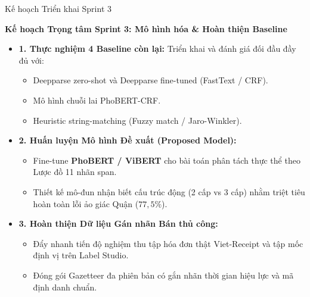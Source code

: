 \documentclass[aspectratio=169,9pt]{beamer}
\begin{document}
\begin{frame}{Kế hoạch Triển khai Sprint 3}
  \vspace{0.05cm}
  \centerline{\large\textbf{Kế hoạch Trọng tâm Sprint 3: Mô hình hóa \& Hoàn thiện Baseline}}
  \vspace{0.25cm}

  \begin{itemize}
    \setlength{\itemsep}{6pt}
    \item \textbf{1. Thực nghiệm 4 Baseline còn lại:} Triển khai và đánh giá đối đầu đầy đủ với:
      \begin{itemize}
        \setlength{\itemsep}{2pt}
        \item Deepparse zero-shot và Deepparse fine-tuned (FastText / CRF).
        \item Mô hình chuỗi lai PhoBERT-CRF.
        \item Heuristic string-matching (Fuzzy match / Jaro-Winkler).
      \end{itemize}
    \item \textbf{2. Huấn luyện Mô hình Đề xuất (Proposed Model):}
      \begin{itemize}
        \setlength{\itemsep}{2pt}
        \item Fine-tune \textbf{PhoBERT / ViBERT} cho bài toán phân tách thực thể theo Lược đồ 11 nhãn span.
        \item Thiết kế mô-đun nhận biết cấu trúc động (2 cấp vs 3 cấp) nhằm triệt tiêu hoàn toàn lỗi ảo giác Quận ($77{,}5\%$).
      \end{itemize}
    \item \textbf{3. Hoàn thiện Dữ liệu Gán nhãn Bán thủ công:}
      \begin{itemize}
        \setlength{\itemsep}{2pt}
        \item Đẩy nhanh tiến độ nghiệm thu tập hóa đơn thật Viet-Receipt và tập mốc định vị trên Label Studio.
        \item Đóng gói Gazetteer đa phiên bản có gắn nhãn thời gian hiệu lực và mã định danh chuẩn.
      \end{itemize}
  \end{itemize}
\end{frame}
\end{document}
